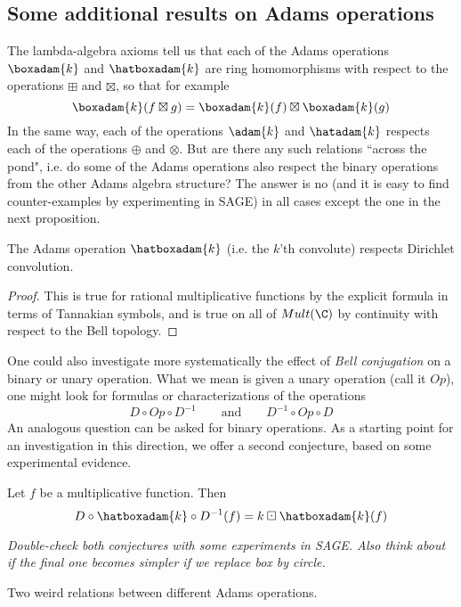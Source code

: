 \documentclass[a4paper]{article}
\begin{document}
\subsection{Some additional results on Adams operations}

The lambda-algebra axioms tell us that each of the Adams operations $\boxadam{k}$ and $\hatboxadam{k}$ are ring homomorphisms with respect to the operations $\boxplus$ and $\boxtimes$, so that for example
$$  \boxadam{k}(f \boxtimes g) = \boxadam{k}(f) \boxtimes \boxadam{k}(g) $$
In the same way, each of the operations $\adam{k}$ and $\hatadam{k}$ respects each of the operations $\oplus$ and $\otimes$. But are there any such relations ``across the pond", i.e. do some of the Adams operations also respect the binary operations from the other Adams algebra structure? The answer is no (and it is easy to find counter-examples by experimenting in SAGE) in all cases except the one in the next proposition.

\begin{proposition}
The Adams operation $\hatboxadam{k}$ (i.e. the $k$'th convolute) respects Dirichlet convolution.
\end{proposition}
\begin{proof}
This is true for rational multiplicative functions by the explicit formula in terms of Tannakian symbols, and is true on all of $Mult(\C)$ by continuity with respect to the Bell topology.
\end{proof}


One could also investigate more systematically the effect of \emph{Bell conjugation} on a binary or unary operation. What we mean is given a unary operation (call it $Op$), one might look for formulas or characterizations of the operations
$$ D \circ Op \circ D^{-1}  \quad \quad \textrm{and}  \quad \quad D^{-1} \circ Op \circ D $$
An analogous question can be asked for binary operations. As a starting point for an investigation in this direction, we offer a second conjecture, based on some experimental evidence.
\begin{conjecture}
Let $f$ be a multiplicative function. Then 
$$ D \circ \hatboxadam{k} \circ D^{-1} ( f ) = k \boxdot \hatboxadam{k} (f)  $$
\end{conjecture}

\emph{Double-check both conjectures with some experiments in SAGE. Also think about if the final one becomes simpler if we replace box by circle. }


\begin{proposition}
Two weird relations between different Adams operations.
\end{proposition}
\end{document}
